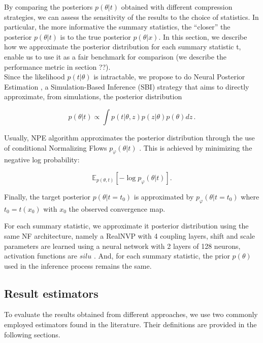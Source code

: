 \documentclass{aa}
\begin{document}
By comparing the posteriors $p(\theta| t)$ obtained with different compression strategies, we can assess the sensitivity of the results to the choice of statistics. In particular, the more informative the summary statistics, the “closer” the posterior $p(\theta | t)$ is to the true posterior $p(\theta | x)$. In this section, we describe how we approximate the posterior distribution for each summary statistic t, enable us to use it as a fair benchmark for comparison (we describe the performance metric in section ??).\\
Since the likelihood $p(t|\theta)$ is intractable, we propose to do Neural Posterior Estimation \citep{npe1, npe2, npe3}, a Simulation-Based Inference (SBI) strategy that aims to directly approximate, from simulations, the posterior distribution 

\begin{equation}
    p(\theta | t) \propto \int p(t | \theta, z) p(z|\theta) p(\theta) dz\,.
\end{equation}

Usually, NPE algorithm approximates the posterior distribution through the use of conditional Normalizing Flows $p_{\varphi} (\theta | t)$ \citep{nf1, nf2}. This is achieved by minimizing the negative log probability: 

\begin{equation}
    \mathbb{E}_{p(\theta, t)} \left[ - \log p_{\varphi} (\theta | t)  \right].
    \label{eq:nll}
\end{equation}

Finally, the target posterior $p(\theta | t = t_0)$ is approximated by $p_{\varphi}(\theta | t = t_0)$ where $t_0 = t(x_0)$ with $x_0$ the observed convergence map.

For each summary statistic, we approximate it posterior distribution using the same NF architecture, namely a RealNVP \citep{realnvp} with 4 coupling layers, shift and scale parameters are learned using a neural network with 2 layers of 128 neurons, activation functions are $silu$ \citep{silu}. And, for each summary statistic, the prior $p(\theta)$ used in the inference process remains the same.
\subsection{Result estimators}
To evaluate the results obtained from different approaches, we use two commonly employed estimators found in the literature. Their definitions are provided in the following sections.
\end{document}
